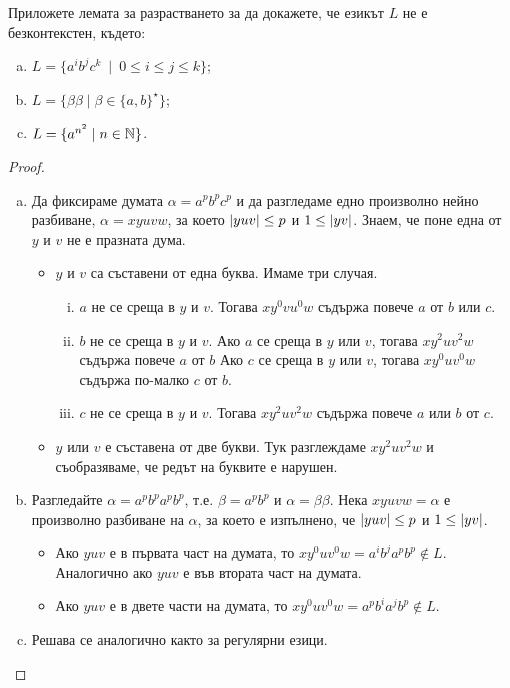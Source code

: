 \begin{example}
  Приложете лемата за разрастването за да докажете, че
  езикът $L$ не е безконтекстен, където:
  \begin{enumerate}[a)]
  \item
    $L = \{a^ib^jc^k\ \mid\ 0 \leq i \leq j \leq k\}$;
  \item
    $L = \{\beta\beta\mid \beta\in \{a,b\}^\star\}$;
  \item
    $L = \{a^{n^2}\mid n\in\mathbb{N}\}$.
  \end{enumerate}
\end{example}
\begin{proof}
  \begin{enumerate}[a)]
  \item
    Да фиксираме думата $\alpha = a^pb^pc^p$ и да разгледаме
    едно произволно нейно разбиване, $\alpha = xyuvw$, за което
    $\lvert{yuv}\rvert \leq p$ и $1 \leq \lvert{yv}\rvert$.
    Знаем, че поне една от $y$ и $v$ не е празната дума.
    \begin{itemize}
    \item
      $y$ и $v$ са съставени от една буква.
      Имаме три случая.
      \begin{enumerate}[i)]
      \item
        $a$ не се среща в $y$ и $v$.
        Тогава $xy^0vu^0w$ съдържа повече $a$ от $b$ или $c$.
      \item
        $b$ не се среща в $y$ и $v$.
        Ако $a$ се среща в $y$ или $v$, тогава $xy^2uv^2w$ съдържа повече $a$ от $b$
        Ако $c$ се среща в $y$ или $v$, тогава $xy^0uv^0w$ съдържа по-малко $c$ от $b$.
      \item
        $c$ не се среща в $y$ и $v$.
        Тогава $xy^2uv^2w$ съдържа повече $a$ или $b$ от $c$.
      \end{enumerate}      
    \item
      $y$ или $v$ е съставена от две букви.
      Тук разглеждаме $xy^2uv^2w$ и съобразяваме, че редът на буквите е нарушен.
    \end{itemize}
  \item
    Разгледайте $\alpha = a^pb^pa^pb^p$, т.е. $\beta = a^pb^p$ и $\alpha = \beta\beta$.
    Нека $xyuvw = \alpha$ е произволно разбиване на $\alpha$, за което е изпълнено, че
    $\lvert{yuv}\rvert \leq p$ и $1\leq \lvert{yv}\rvert$.
    \begin{itemize}
    \item
      Ако $yuv$ е в първата част на думата, то 
      $xy^0uv^0w = a^ib^ja^pb^p \not\in L$.
      Аналогично ако $yuv$ е във втората част на думата.
    \item
      Ако $yuv$ е в двете части на думата, то 
      $xy^0uv^0w = a^pb^ia^jb^p \not\in L$.
    \end{itemize}    
  \item
    Решава се аналогично както за регулярни езици.
  \end{enumerate}
\end{proof}


